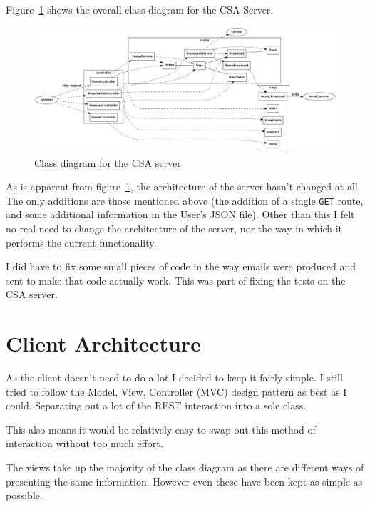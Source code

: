 \documentclass{article}
\begin{document}
Figure~\ref{fig:server-uml-class} shows the overall class diagram for the CSA Server.

\begin{figure}[h]
\centering
\includegraphics[width=.95\textheight, angle=90]{img/server-uml-class.png}
\caption{Class diagram for the CSA server}
\label{fig:server-uml-class}
\end{figure}

As is apparent from figure~\ref{fig:server-uml-class}, the architecture of the server
hasn't changed at all. The only additions are those mentioned above (the addition of a
single \verb$GET$ route, and some additional information in the User's JSON file). Other
than this I felt no real need to change the architecture of the server, nor the way in
which it performs the current functionality.

I did have to fix some small pieces of code in the way emails were produced and sent to
make that code actually work. This was part of fixing the tests on the CSA server.

\clearpage
\section{Client Architecture}
As the client doesn't need to do a lot I decided to keep it fairly simple. I still tried
to follow the Model, View, Controller (MVC) design pattern as best as I could. Separating
out a lot of the REST interaction into a sole class.

This also means it would be relatively easy to swap out this method of interaction 
without too much effort.

The views take up the majority of the class diagram as there are different ways of 
presenting the same information. However even these have been kept as simple as possible.
\end{document}
